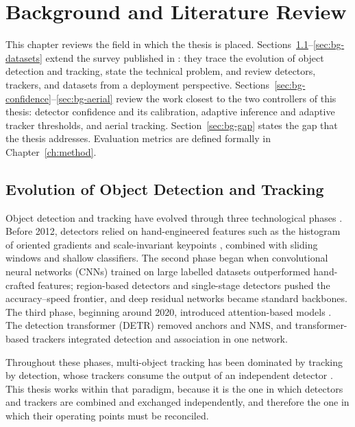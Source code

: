 \chapter{Background and Literature Review}\label{ch:background}

This chapter reviews the field in which the thesis is placed. Sections~\ref{sec:bg-evolution}--\ref{sec:bg-datasets} extend the survey published in \cite{ismail2026realtime}: they trace the evolution of object detection and tracking, state the technical problem, and review detectors, trackers, and datasets from a deployment perspective. Sections~\ref{sec:bg-confidence}--\ref{sec:bg-aerial} review the work closest to the two controllers of this thesis: detector confidence and its calibration, adaptive inference and adaptive tracker thresholds, and aerial tracking. Section~\ref{sec:bg-gap} states the gap that the thesis addresses. Evaluation metrics are defined formally in Chapter~\ref{ch:method}.

\section{Evolution of Object Detection and Tracking}\label{sec:bg-evolution}
Object detection and tracking have evolved through three technological phases \cite{li2025motreview}. Before 2012, detectors relied on hand-engineered features such as the histogram of oriented gradients \cite{dalal2005hog} and scale-invariant keypoints \cite{lowe2004sift}, combined with sliding windows and shallow classifiers. The second phase began when convolutional neural networks (CNNs) trained on large labelled datasets \cite{krizhevsky2017alexnet,russakovsky2015imagenet} outperformed hand-crafted features; region-based detectors \cite{girshick2014rcnn,ren2017fasterrcnn} and single-stage detectors \cite{redmon2016yolo,liu2016ssd} pushed the accuracy--speed frontier, and deep residual networks \cite{he2016resnet} became standard backbones. The third phase, beginning around 2020, introduced attention-based models \cite{vaswani2017attention,dosovitskiy2021vit}. The detection transformer (DETR) \cite{carion2020detr} removed anchors and NMS, and transformer-based trackers \cite{sun2020transtrack,meinhardt2022trackformer,zeng2022motr} integrated detection and association in one network.

Throughout these phases, multi-object tracking has been dominated by tracking by detection, whose trackers consume the output of an independent detector \cite{bewley2016sort,zhang2022bytetrack}. This thesis works within that paradigm, because it is the one in which detectors and trackers are combined and exchanged independently, and therefore the one in which their operating points must be reconciled.

